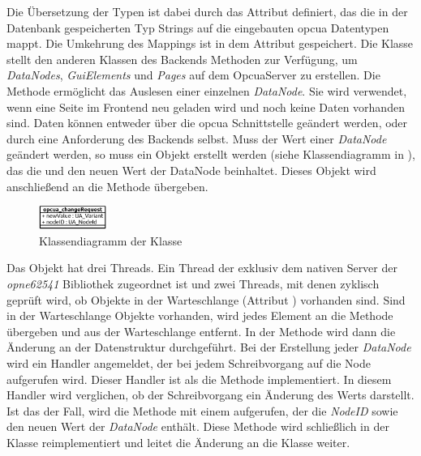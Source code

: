 Die Übersetzung der Typen ist dabei durch das Attribut  definiert, das die in der Datenbank gespeicherten Typ Strings auf die eingebauten \ac{opcua} Datentypen mappt.
Die Umkehrung des Mappings ist in dem Attribut \mbox{} gespeichert.
Die Klasse  stellt den anderen Klassen des Backends Methoden zur Verfügung, um \emph{DataNodes}, \emph{GuiElements} und \emph{Pages} auf dem OpcuaServer zu erstellen.
Die Methode  ermöglicht das Auslesen einer einzelnen \emph{DataNode}. 
Sie wird verwendet, wenn eine Seite im Frontend neu geladen wird und noch keine Daten vorhanden sind.
Daten können entweder über die \ac{opcua} Schnittstelle geändert werden, oder durch eine Anforderung des Backends selbst.
Muss der Wert einer \emph{DataNode} geändert werden, so muss ein  Objekt erstellt werden (siehe Klassendiagramm in ), 
das die  und den neuen Wert der DataNode beinhaltet. Dieses Objekt wird anschließend an die Methode  übergeben.
\begin{figure}[ht]
  \centering
  \includegraphics[width=0.2\textwidth]{content/hauptteil/umsetzungPoC/backend/uml/classesOfOverview/opcua_changeRequest.pdf}
  \caption{Klassendiagramm der Klasse }
  \label{fig:backend:classDiag:opcuaCR}
\end{figure}
Das  Objekt hat drei Threads. 
Ein Thread der exklusiv dem nativen Server der \emph{opne62541} Bibliothek zugeordnet ist und zwei Threads, mit denen zyklisch geprüft wird, 
ob  Objekte in der Warteschlange (Attribut ) vorhanden sind.
Sind in der Warteschlange  Objekte vorhanden, wird jedes Element an die Methode  übergeben und aus der Warteschlange entfernt.
In der Methode  wird dann die Änderung an der Datenstruktur durchgeführt. %
Bei der Erstellung jeder \emph{DataNode} wird ein Handler angemeldet, der bei jedem Schreibvorgang auf die Node aufgerufen wird.
Dieser Handler ist als die Methode  implementiert.
In diesem Handler wird verglichen, ob der Schreibvorgang ein Änderung des Werts darstellt. 
Ist das der Fall, wird die Methode  mit einem  aufgerufen, der die \emph{NodeID} sowie den neuen Wert der \emph{DataNode} enthält.
Diese Methode wird schließlich in der  Klasse reimplementiert und leitet die Änderung an die  Klasse weiter. 